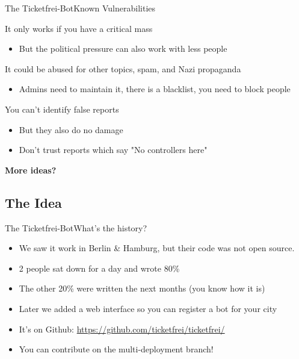 \documentclass[10pt]{beamer}
\begin{document}
{\begin{frame}{The Ticketfrei-Bot}{Known Vulnerabilities}
\begin{block}{It only works if you have a critical mass}
  \begin{itemize}
    \item But the political pressure can also work with less people
  \end{itemize}
\end{block}

\begin{block}{It could be abused for other topics, spam, and Nazi propaganda}
  \begin{itemize}
    \item Admins need to maintain it, there is a blacklist, you need to block people
  \end{itemize}
\end{block}

\begin{block}{You can't identify false reports}
  \begin{itemize}
    \item But they also do no damage
    \item Don't trust reports which say "No controllers here"
  \end{itemize}
\end{block}

\textbf{More ideas?}

\end{frame}

\subsection{The Idea}
\begin{frame}{The Ticketfrei-Bot}{What's the history?}

\begin{itemize}
    \item We saw it work in Berlin \& Hamburg, but their code was not open source.
    \item 2 people sat down for a day and wrote 80\%
    \item The other 20\% were written the next months (you know how it is)
    \item Later we added a web interface so you can register a bot for your city
    \item<2-> It's on Github: \url{https://github.com/ticketfrei/ticketfrei/}
    \item<2-> You can contribute on the multi-deployment branch!
\end{itemize}
    

\end{frame}}
\end{document}
